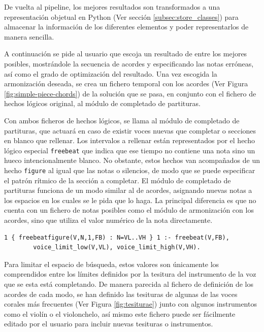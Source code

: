 De vuelta al pipeline, los mejores resultados son transformados a una representación objetual en Python (Ver sección \ref{subsec:store_classes}) para almacenar la información de los diferentes elementos y poder representarlos de manera sencilla. 

A continuación se pide al usuario que escoja un resultado de entre los mejores posibles, mostrándole la secuencia de acordes y especificando las notas erróneas, así como el grado de optimización del resultado. Una vez escogida la armonización deseada, se crea un fichero temporal con los acordes (Ver Figura \ref{fig:simple-piece-chords}) de la solución que se pasa, en conjunto con el fichero de hechos lógicos original, al módulo de completado de partituras. 

Con ambos ficheros de hechos lógicos, se llama al módulo de completado de partituras, que actuará en caso de existir voces nuevas que completar o secciones en blanco que rellenar. Los intervalos a rellenar están representados por el hecho lógico especial \texttt{freebeat} que indica que ese tiempo no contiene una nota sino un hueco intencionalmente blanco. No obstante, estos hechos van acompañados de un hecho \texttt{figure} al igual que las notas o silencios, de modo que se puede especificar el patrón rítmico de la sección a completar.
El módulo de completado de partituras funciona de un modo similar al de acordes, asignando nuevas notas a los espacios en los cuales se le pida que lo haga. La principal diferencia es que no cuenta con un fichero de notas posibles como el módulo de armonización con los acordes, sino que utiliza el valor numérico de la nota directamente. 

\begin{Verbatim}[frame=single]
1 { freebeatfigure(V,N,1,FB) : N=VL..VH } 1 :- freebeat(V,FB),
		voice_limit_low(V,VL), voice_limit_high(V,VH).
\end{Verbatim}

Para limitar el espacio de búsqueda, estos valores son únicamente los comprendidos entre los límites definidos por la tesitura del instrumento de la voz que se esta está completando. De manera parecida al fichero de definición de los acordes de cada modo, se han definido las tesituras de algunas de las voces corales más frecuentes (Ver Figura \ref{fig:tesiturae}) junto con algunos instrumentos como el violín o el violonchelo, así mismo este fichero puede ser fácilmente editado por el usuario para incluir nuevas tesituras o instrumentos.

